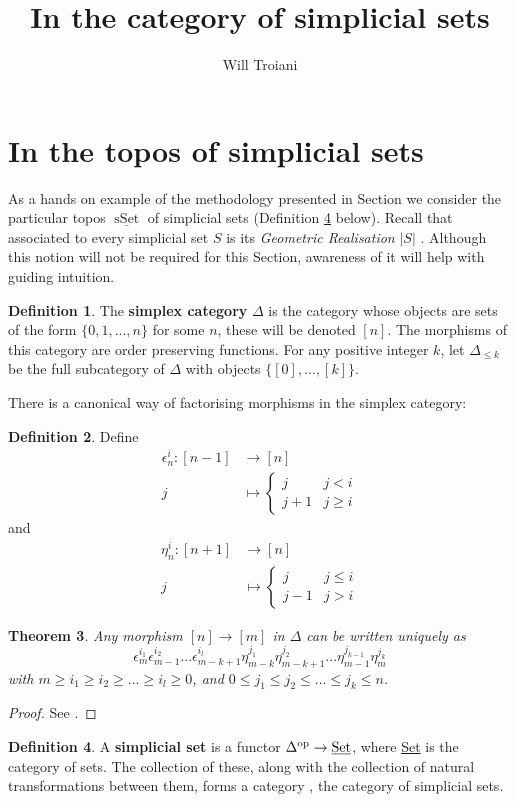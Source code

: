 \documentclass[12pt]{article}
\title{In the category of simplicial sets}
\author{Will Troiani}
\theoremstyle{plain}
\newtheorem{thm}{Theorem}[subsection] %
\theoremstyle{definition}
\newtheorem{defn}[thm]{Definition} %
\begin{document}
	
	\maketitle
\section{In the topos of simplicial sets}
As a hands on example of the methodology presented in Section \cite[\S 5]{FiniteColimits} we consider the particular topos $\underline{\operatorname{sSet}}$ of simplicial sets (Definition \ref{def:simplicialset} below). Recall that associated to every simplicial set $S$ is its \emph{Geometric Realisation} $|S|$ \cite{Milnor}. Although this notion will not be required for this Section, awareness of it will help with guiding intuition.

\begin{defn}
	\label{simplexcategory}
	The \textbf{simplex category} $\Delta$ is the category whose objects are sets of the form $\lbrace 0,1,...,n\rbrace$ for some $n$, these will be denoted $[n]$. The morphisms of this category are order preserving functions. For any positive integer $k$, let $\Delta_{\leq k}$ be the full subcategory of $\Delta$ with objects $\lbrace [0],...,[k]\rbrace$.
\end{defn}
%
There is a canonical way of factorising morphisms in the simplex category:
%
\begin{defn}
	Define
	\begin{align*}
		\epsilon_n^i: [n - 1] &\to [n]\\
		j &\mapsto 
		\begin{cases}
			j&j < i\\
			j+1&j \geq i
		\end{cases}
	\end{align*}
	and
	\begin{align*}
		\eta_n^i: [n + 1] &\to [n]\\
		j &\mapsto 
		\begin{cases}
			j& j \leq i\\
			j-1& j > i
		\end{cases}
	\end{align*}
\end{defn}
%
\begin{thm}
	\label{facedegen}
	Any morphism $[n] \to [m]$ in $\Delta$ can be written uniquely as
	\[\epsilon_{m}^{i_1}\epsilon_{m-1}^{i_2}...\epsilon_{m - k + 1}^{i_l}\eta_{m - k}^{j_1}\eta_{m - k + 1}^{j_2}...\eta_{m-1}^{j_{k-1}}\eta_m^{j_k}\]
	with $m \geq i_1 \geq i_2 \geq ... \geq i_l \geq 0$, and $0 \leq j_1 \leq j_2 \leq ... \leq j_{k} \leq n$.
\end{thm}
\begin{proof}
	See \cite[\S VIII.5.1]{MacLane}.
\end{proof}
%
\begin{defn}
	\label{def:simplicialset}
	A \textbf{simplicial set} is a functor $\Delta^\text{op} \to \text{\underline{Set}}$, where \underline{Set} is the category of sets. The collection of these, along with the collection of natural transformations between them, forms a category , the category of simplicial sets.
\end{defn}
\end{document}
